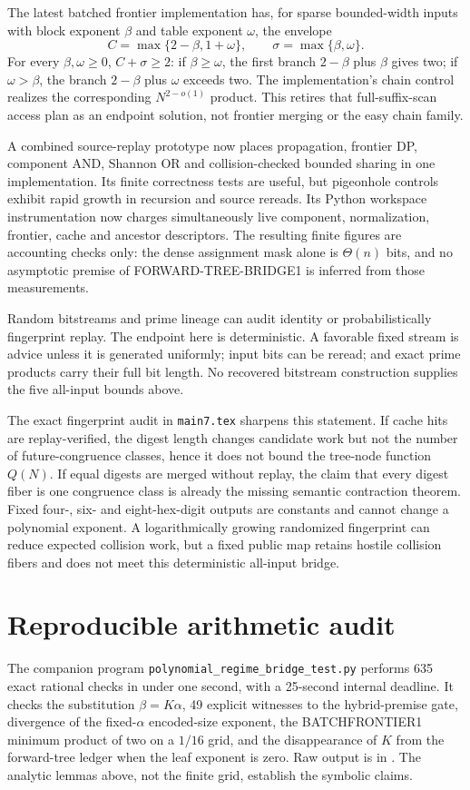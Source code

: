 \documentclass[11pt]{article}
\begin{document}
The latest batched frontier implementation has, for sparse bounded-width
inputs with block exponent $\beta$ and table exponent $\omega$, the envelope
\[
 C=\max\{2-\beta,1+\omega\},\qquad
 \sigma=\max\{\beta,\omega\}.
\]
For every $\beta,\omega\ge0$, $C+\sigma\ge2$: if
$\beta\ge\omega$, the first branch $2-\beta$ plus $\beta$ gives two;
if $\omega>\beta$, the branch $2-\beta$ plus $\omega$ exceeds two.  The implementation's
chain control realizes the corresponding $N^{2-o(1)}$ product.  This retires
that full-suffix-scan access plan as an endpoint solution, not frontier
merging or the easy chain family.

A combined source-replay prototype now places propagation, frontier DP,
component AND, Shannon OR and collision-checked bounded sharing in one
implementation.  Its finite correctness tests are useful, but pigeonhole
controls exhibit rapid growth in recursion and source rereads.  Its Python
workspace instrumentation now charges simultaneously live component,
normalization, frontier, cache and ancestor descriptors.  The resulting
finite figures are accounting checks only: the dense assignment mask alone
is $\Theta(n)$ bits, and no asymptotic premise of
FORWARD-TREE-BRIDGE1 is inferred from those measurements.

Random bitstreams and prime lineage can audit identity or probabilistically
fingerprint replay.  The endpoint here is deterministic.  A favorable fixed
stream is advice unless it is generated uniformly; input bits can be reread;
and exact prime products carry their full bit length.  No recovered bitstream
construction supplies the five all-input bounds above.

The exact fingerprint audit in \texttt{main7.tex} sharpens this statement.
If cache hits are replay-verified, the digest length changes candidate work
but not the number of future-congruence classes, hence it does not bound the
tree-node function $Q(N)$.  If equal digests are merged without replay, the
claim that every digest fiber is one congruence class is already the missing
semantic contraction theorem.  Fixed four-, six- and eight-hex-digit outputs
are constants and cannot change a polynomial exponent.  A logarithmically
growing randomized fingerprint can reduce expected collision work, but a
fixed public map retains hostile collision fibers and does not meet this
deterministic all-input bridge.

\section{Reproducible arithmetic audit}
The companion program \texttt{polynomial\_regime\_bridge\_test.py} performs
635 exact rational checks in under one second, with a 25-second internal
deadline.  It checks the substitution $\beta=K\alpha$, 49 explicit witnesses
to the hybrid-premise gate, divergence of the fixed-$\alpha$ encoded-size
exponent, the BATCHFRONTIER1 minimum product of two on a $1/16$ grid, and the
disappearance of $K$ from the forward-tree ledger when the leaf exponent is
zero.  Raw output is in
.  The analytic lemmas above,
not the finite grid, establish the symbolic claims.
\end{document}
